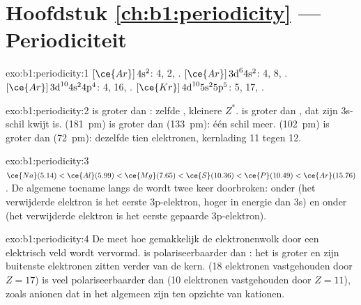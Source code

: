 \section*{Hoofdstuk \ref{ch:b1:periodicity} --- Periodiciteit}

\begin{solution}{exo:b1:periodicity:1}
 $[\ce{Ar}]\,4\text{s}^2$:  4,  2, . 
$[\ce{Ar}]\,3\text{d}^6 4\text{s}^2$:  4,  8, . 
$[\ce{Ar}]\,3\text{d}^{10} 4\text{s}^2 4\text{p}^4$:  4,  16,
.  $[\ce{Kr}]\,4\text{d}^{10} 5\text{s}^2 5\text{p}^5$:  5,
 17, .
\end{solution}

\begin{solution}{exo:b1:periodicity:2}
 is groter dan : zelfde , kleinere $Z^{*}$. 
is groter dan , dat zijn 3s-schil kwijt is. 
(\qty{181}{pm}) is groter dan  (\qty{133}{pm}): één schil meer.
 (\qty{102}{pm}) is groter dan  (\qty{72}{pm}):
dezelfde tien elektronen, kernlading 11 tegen 12.
\end{solution}

\begin{solution}{exo:b1:periodicity:3}
$\ce{Na} (5.14) < \ce{Al} (5.99) < \ce{Mg} (7.65) < \ce{S} (10.36) <
\ce{P} (10.49) < \ce{Ar} (15.76)$. De algemene toename langs de 
wordt twee keer doorbroken:  onder  (het verwijderde
elektron is het eerste 3p-elektron, hoger in energie dan 3s) en 
onder  (het verwijderde elektron is het eerste gepaarde
3p-elektron).
\end{solution}

\begin{solution}{exo:b1:periodicity:4}
De  meet hoe gemakkelijk de elektronenwolk door een
elektrisch veld wordt vervormd.  is polariseerbaarder dan
: het is groter en zijn buitenste elektronen zitten verder van de
kern.  (18 elektronen vastgehouden door $Z = 17$) is veel
polariseerbaarder dan  (10 elektronen vastgehouden door
$Z = 11$), zoals anionen dat in het algemeen zijn ten opzichte van
kationen.
\end{solution}

